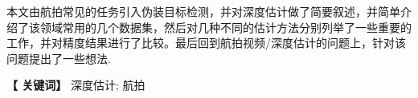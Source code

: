 \newpage


\centerline{\fangsong\bf{}}


\vskip 1cm


\vskip 10bp

{
	\kaishu	
	本文由航拍常见的任务引入伪装目标检测，并对深度估计做了简要叙述，并简单介绍了该领域常用的几个数据集，然后对几种不同的估计方法分别列举了一些重要的工作，并对精度结果进行了比较。最后回到航拍视频/深度估计的问题上，针对该问题提出了一些想法.
	
	\vskip 10bp
	
	\hspace{5bp} {\textbf{【 关键词】}} 
	深度估计; 航拍 
}